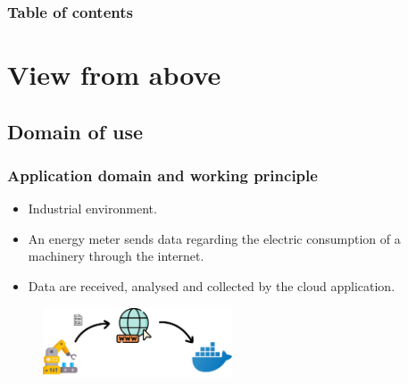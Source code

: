 \begin{frame}
	\frametitle{Table of contents}
	\tableofcontents
\end{frame}

\section{View from above}

\subsection{Domain of use}
\begin{frame}
	\frametitle{Application domain and working principle}
	
	\begin{itemize}
		\item Industrial environment.\\
		\item An energy meter sends data regarding the electric consumption of a machinery through the internet.\\
		\item Data are received, analysed and collected by the cloud application.
	\end{itemize}
	
	\bigskip
	\begin{figure}[h]
		\centering
		\includegraphics[width=0.5\textwidth]{./img/general_domain.png}
	\end{figure}
\end{frame}


